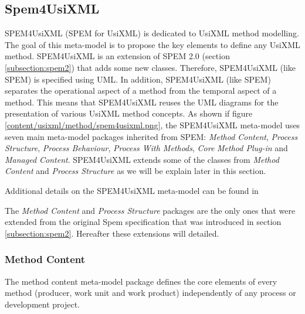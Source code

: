 \subsection{Spem4UsiXML}
\label{subsection:spem4usixml}

SPEM4UsiXML (SPEM for UsiXML) is dedicated to UsiXML method modelling. The goal of this meta-model is to propose the key elements to define any UsiXML method. SPEM4UsiXML is an extension of SPEM 2.0 (section \ref{subsection:spem2}) that adds some new classes. Therefore, SPEM4UsiXML (like SPEM) is specified using UML. In addition, SPEM4UsiXML (like SPEM) separates the operational aspect of a method from the temporal aspect of a method. This means that SPEM4UsiXML reuses the UML diagrams for the presentation of various UsiXML method concepts. As shown if figure \ref{content/usixml/method/spem4usixml.png}, the SPEM4UsiXML meta-model uses seven main meta-model packages inherited from SPEM: \textit{Method Content}, \textit{Process Structure}, \textit{Process Behaviour}, \textit{Process With Methods}, \textit{Core} \textit{Method Plug-in} and \textit{Managed Content}. SPEM4UsiXML extends some of the classes from \textit{Method Content} and \textit{Process Structure} as we will be explain later in this section.

Additional details on the SPEM4UsiXML meta-model can be found in \cite{usixmlmethod}


The \textit{Method Content} and \textit{Process Structure} packages are the only ones that were extended from the original Spem specification that was introduced in section \ref{subsection:spem2}. Hereafter these extensions will detailed.

\subsubsection{Method Content}

The method content meta-model package defines the core elements of every method (producer, work unit and work product) independently of any process or development project.


